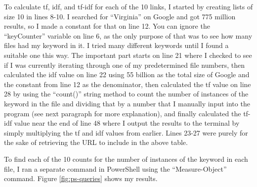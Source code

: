 \documentclass[12pt]{article}
\begin{document}
To calculate tf, idf, and tf-idf for each of the 10 links, I started by creating lists of size 10 in lines 8-10. I searched for ``Virginia'' on Google and got 775 million results, so I made a constant for that on line 12. You can ignore the ``keyCounter'' variable on line 6, as the only purpose of that was to see how many files had my keyword in it. I tried many different keywords until I found a suitable one this way. The important part starts on line 21 where I checked to see if I was currently iterating through one of my predetermined file numbers, then calculated the idf value on line 22 using 55 billion as the total size of Google and the constant from line 12 as the denominator, then calculated the tf value on line 28 by using the ``count()'' string method to count the number of instances of the keyword in the file and dividing that by a number that I manually input into the program (see next paragraph for more explanation), and finally calculated the tf-idf value near the end of line 48 where I output the results to the terminal by simply multiplying the tf and idf values from earlier. Lines 23-27 were purely for the sake of retrieving the URL to include in the above table.

To find each of the 10 counts for the number of instances of the keyword in each file, I ran a separate command in PowerShell using the ``Measure-Object'' command. Figure \ref{fig:ps-queries} shows my results.
\end{document}
